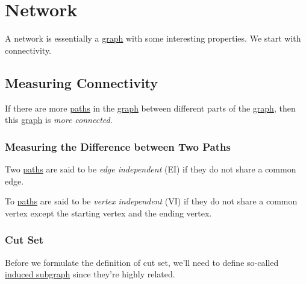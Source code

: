 \chapter{Network}
A network is essentially a \hyperref[def:graph]{graph} with some interesting properties. We start with connectivity.

\section{Measuring Connectivity}
\begin{intuition}
	If there are more \hyperref[def:path]{paths} in the \hyperref[def:graph]{graph} between different parts of the \hyperref[def:graph]{graph}, then this
	\hyperref[def:graph]{graph} is \emph{more connected}.
\end{intuition}

\subsection{Measuring the Difference between Two Paths}
\begin{definition}\label{def:edge-independent}
	Two \hyperref[def:path]{paths} are said to be \emph{edge independent} (EI) if they do not share a common edge.
\end{definition}

\begin{definition}\label{def:vertex-independent}
	To \hyperref[def:path]{paths} are said to be \emph{vertex independent} (VI) if they do not share a common vertex except the starting vertex and the ending vertex.
\end{definition}

\subsection{Cut Set}
Before we formulate the definition of cut set, we'll need to define so-called \hyperref[def:induced-subgraph]{induced subgraph} since they're highly related.

